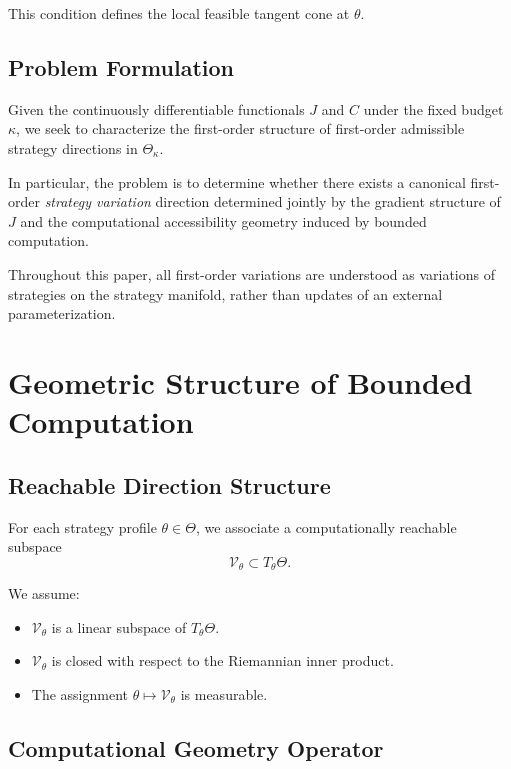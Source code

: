 \documentclass[11pt,a4paper,twocolumn]{article}
\begin{document}
This condition defines the local feasible tangent cone at $\theta$.

\subsection{Problem Formulation}

Given the continuously differentiable functionals $J$ and $C$ under the fixed budget $\kappa$, we seek to characterize the first-order structure of first-order admissible strategy directions in $\Theta_\kappa$.

In particular, the problem is to determine whether there exists a canonical first-order \emph{strategy variation} direction determined jointly by the gradient structure of $J$ and the computational accessibility geometry induced by bounded computation.

 

Throughout this paper, all first-order variations are understood as variations of strategies on the strategy manifold, rather than updates of an external parameterization.
\section{Geometric Structure of Bounded Computation}
 
 \subsection{Reachable Direction Structure}
 
 For each strategy profile $\theta \in \Theta$, we associate a computationally reachable subspace
 \[
 \mathcal{V}_\theta \subset T_\theta \Theta.
 \]
 
 We assume:
 
 \begin{itemize}
  \item[(A1)] $\mathcal{V}_\theta$ is a linear subspace of $T_\theta \Theta$.
  \item[(A2)] $\mathcal{V}_\theta$ is closed with respect to the Riemannian inner product.
  \item[(A3)] The assignment $\theta \mapsto \mathcal{V}_\theta$ is measurable.
 \end{itemize}
 
 \subsection{Computational Geometry Operator}
 
\end{document}
